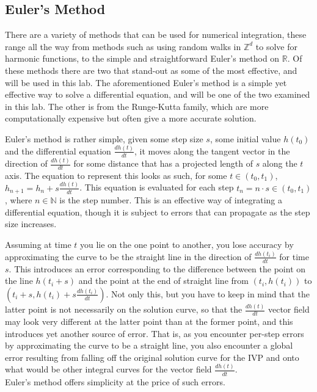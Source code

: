 \documentclass[11pt]{article}
\begin{document}
\subsection{Euler's Method}
  There are a variety of methods that can be used for numerical integration, these range all the way from methods such as using random walks in $\mathbb{Z}^d$ to solve for harmonic functions, to the simple and straightforward Euler's method on $\mathbb{R}$.
    Of these methods there are two that stand-out as some of the most effective, and will be used in this lab.
    The aforementioned Euler's method is a simple yet effective way to solve a differential equation, and will be one of the two examined in this lab.
    The other is from the Runge-Kutta family, which are more computationally expensive but often give a more accurate solution.

    Euler's method is rather simple, given some step size $s$, some initial value $h(t_0)$ and the differential equation $\frac{dh(t)}{dt}$, it moves along the tangent vector in the direction of $\frac{dh(t)}{dt}$ for some distance that has a projected length of $s$ along the $t$ axis.
    The equation to represent this looks as such, for some $t \in (t_0,t_1)$, $h_{n+1} = h_n + s\frac{dh(t)}{dt}$.
    This equation is evaluated for each step $t_n = n\cdot s \in (t_0,t_1)$, where $n \in \mathbb{N}$ is the step number.
    This is an effective way of integrating a differential equation, though it is subject to errors that can propagate as the step size increases.

    Assuming at time $t$ you lie on the one point to another, you lose accuracy by approximating the curve to be the straight line in the direction of $\frac{dh(t_i)}{dt}$ for time $s$.
    This introduces an error corresponding to the difference between the point on the line $h(t_i+s)$ and the point at the end of straight line from $(t_i, h(t_i))$ to $(t_i + s, h(t_i) + s\frac{dh(t_i)}{dt})$.
    Not only this, but you have to keep in mind that the latter point is not necessarily on the solution curve, so that the $\frac{dh(t)}{dt}$ vector field may look very different at the latter point than at the former point, and this introduces yet another source of error.
    That is, as you encounter per-step errors by approximating the curve to be a straight line, you also encounter a global error resulting from falling off the original solution curve for the IVP and onto what would be other integral curves for the vector field $\frac{dh(t)}{dt}$.\\
    Euler's method offers simplicity at the price of such errors.
\end{document}

